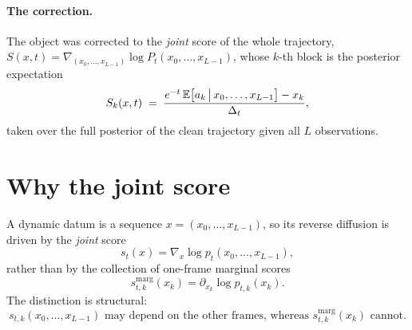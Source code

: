 \paragraph{The correction.} The object was corrected to the \emph{joint} score of the whole trajectory,
$S(x,t) = \nabla_{(x_0,\dots,x_{L-1})} \log P_t(x_0,\dots,x_{L-1})$, whose
$k$-th block is the posterior expectation
\begin{equation}
  S_k(x,t) \;=\; \frac{e^{-t}\,\mathbb{E}\big[a_k \,\big|\, x_0,\dots,x_{L-1}\big] - x_k}{\Delta_t},
  \label{eq:dev-joint-block}
\end{equation}
taken over the full posterior of the clean trajectory given all $L$
observations.

\section{Why the joint score}\label{sec:dev-correction}

A dynamic datum is a sequence
$x=(x_0,\ldots,x_{L-1})$, so its reverse diffusion is driven by the
\emph{joint} score
\begin{equation}
  s_t(x)
  =
  \nabla_x \log p_t(x_0,\ldots,x_{L-1}),
  \label{eq:dev-joint-score}
\end{equation}
rather than by the collection of one-frame marginal scores
\[
  s^{\mathrm{marg}}_{t,k}(x_k)
  =
  \partial_{x_k}\log p_{t,k}(x_k).
\]
The distinction is structural:
\begin{equation}
  \boxed{
  s_{t,k}(x_0,\ldots,x_{L-1})
  \text{ may depend on the other frames, whereas }
  s^{\mathrm{marg}}_{t,k}(x_k)
  \text{ cannot.}}
  \label{eq:dev-joint-vs-marginal}
\end{equation}

